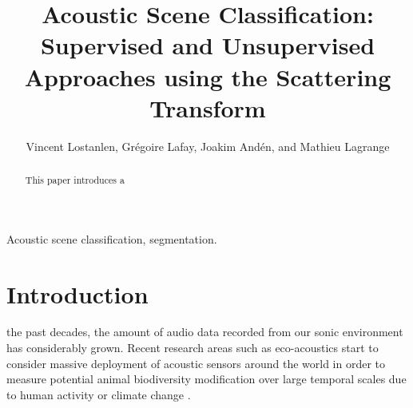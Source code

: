 \documentclass[journal]{IEEEtran}
\begin{document}
%
\title{Acoustic Scene Classification: \\ Supervised and Unsupervised Approaches using the Scattering Transform}

\author{Vincent Lostanlen, Gr\'egoire Lafay, Joakim And\'en, and Mathieu Lagrange}


\maketitle

\begin{abstract}
This paper introduces a 
\end{abstract}

\begin{IEEEkeywords}
Acoustic scene classification, segmentation.
\end{IEEEkeywords}






%
\IEEEpeerreviewmaketitle

\section{Introduction}

 the past decades, the amount of audio data recorded from our sonic environment has considerably grown. Recent research areas such as eco-acoustics \cite{ECOACOUSTICS2014, krause} start to consider massive deployment of acoustic sensors around the world in order to measure potential animal biodiversity modification over large temporal scales due to human activity or climate change \cite{NessSST13, stowell13a, stowell13b}. 
\end{document}
